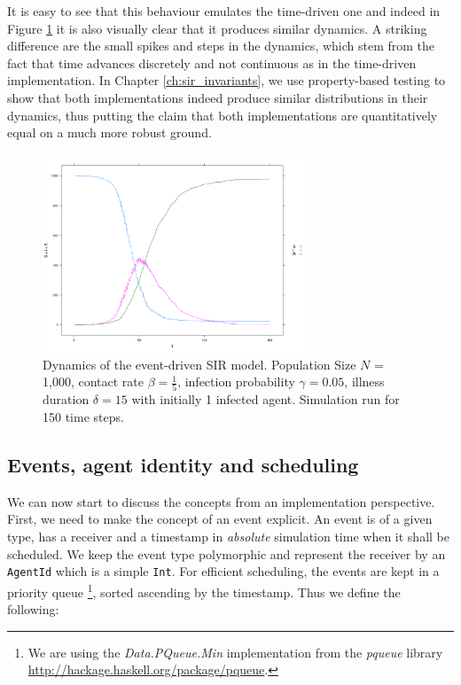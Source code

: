 \medskip

It is easy to see that this behaviour emulates the time-driven one and indeed in Figure \ref{fig:sir_eventdriven_dynamics} it is also visually clear that it produces similar dynamics. A striking difference are the small spikes and steps in the dynamics, which stem from the fact that time advances discretely and not continuous as in the time-driven implementation. In Chapter \ref{ch:sir_invariants}, we use property-based testing to show that both implementations indeed produce similar distributions in their dynamics, thus putting the claim that both implementations are quantitatively equal on a much more robust ground.

\begin{figure}
	\centering
	\includegraphics[width=0.7\textwidth, angle=0]{./fig/eventdriven/sir_eventdriven.png}
	\caption{Dynamics of the event-driven SIR model. Population Size $N$ = 1,000, contact rate $\beta = \frac{1}{5}$, infection probability $\gamma = 0.05$, illness duration $\delta = 15$ with initially 1 infected agent. Simulation run for 150 time steps.}
	\label{fig:sir_eventdriven_dynamics}
\end{figure}

\subsection{Events, agent identity and scheduling}
We can now start to discuss the concepts from an implementation perspective. First, we need to make the concept of an event explicit. An event is of a given type, has a receiver and a timestamp in \textit{absolute} simulation time when it shall be scheduled. We keep the event type polymorphic and represent the receiver by an \texttt{AgentId} which is a simple \texttt{Int}. For efficient scheduling, the events are kept in a priority queue \footnote{We are using the \textit{Data.PQueue.Min} implementation from the \textit{pqueue} library \url{http://hackage.haskell.org/package/pqueue}.}, sorted ascending by the timestamp. Thus we define the following:

